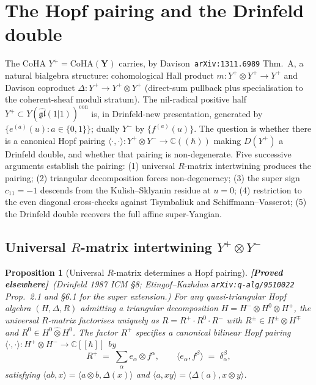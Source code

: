 \documentclass[11pt]{amsart}
\newtheorem{proposition}[theorem]{Proposition}
\theoremstyle{definition}
\providecommand{\CoHA}{\mathrm{CoHA}}
\providecommand{\bY}{\mathbf{Y}}
\providecommand{\bC}{\mathbb{C}}
\providecommand{\fgl}{\mathfrak{gl}}
\providecommand{\ClaimStatusProvedElsewhere}{\textbf{\textsf{[Proved elsewhere]}}}
\begin{document}
\section{The Hopf pairing and the Drinfeld double}

The CoHA $Y^+ = \CoHA(\bY)$ carries, by Davison~\texttt{arXiv:1311.6989}
Thm.~A, a natural bialgebra structure: cohomological Hall product
$m : Y^+ \otimes Y^+ \to Y^+$ and Davison coproduct
$\Delta : Y^+ \to Y^+ \otimes Y^+$ (direct-sum pullback plus specialisation
to the coherent-sheaf moduli stratum). The nil-radical positive half
$Y^+ \subset Y(\widehat{\fgl}(1|1))^{\mathrm{con}}$ is, in Drinfeld-new
presentation, generated by $\{e^{(a)}(u) : a \in \{0,1\}\}$; dually $Y^-$
by $\{f^{(a)}(u)\}$. The question is whether there is a canonical Hopf
pairing
$\langle \cdot, \cdot \rangle : Y^+ \otimes Y^- \to \bC((\hbar))$ making
$D(Y^+)$ a Drinfeld double, and whether that pairing is non-degenerate.
Five successive arguments establish the pairing: (1) universal
$R$-matrix intertwining produces the pairing; (2) triangular decomposition
forces non-degeneracy; (3) the super sign $c_{11} = -1$ descends from
the Kulish--Sklyanin residue at $u = 0$; (4) restriction to the even
diagonal cross-checks against Tsymbaliuk and Schiffmann--Vasserot; (5) the
Drinfeld double recovers the full affine super-Yangian.

\subsection{Universal $R$-matrix intertwining $Y^+ \otimes Y^-$}
\label{subsec:cycle1-R-matrix-intertwining}

\begin{proposition}[Universal $R$-matrix determines a Hopf pairing]
\label{prop:cycle1-R-pairing}
\ClaimStatusProvedElsewhere\
\emph{(Drinfeld 1987 ICM \S8; Etingof--Kazhdan
\texttt{arXiv:q-alg/9510022} Prop.~2.1 and \S6.1 for the super extension.)}
For any quasi-triangular Hopf algebra $(H, \Delta, R)$ admitting a
triangular decomposition $H = H^- \otimes H^0 \otimes H^+$, the universal
$R$-matrix factorises uniquely as $R = R^+ \cdot R^0 \cdot R^-$ with
$R^\pm \in H^\pm \hat\otimes H^\mp$ and $R^0 \in H^0 \hat\otimes H^0$. The
factor $R^+$ specifies a canonical bilinear Hopf pairing
$\langle \cdot, \cdot \rangle : H^+ \otimes H^- \to \bC[[\hbar]]$ by
\[
  R^+ \;=\; \sum_\alpha e_\alpha \otimes f^\alpha, \qquad
  \langle e_\alpha, f^\beta \rangle \;=\; \delta_\alpha^\beta,
\]
satisfying $\langle ab, x \rangle = \langle a \otimes b, \Delta(x)\rangle$
and $\langle a, xy \rangle = \langle \Delta(a), x \otimes y\rangle$.
\end{proposition}
\end{document}
